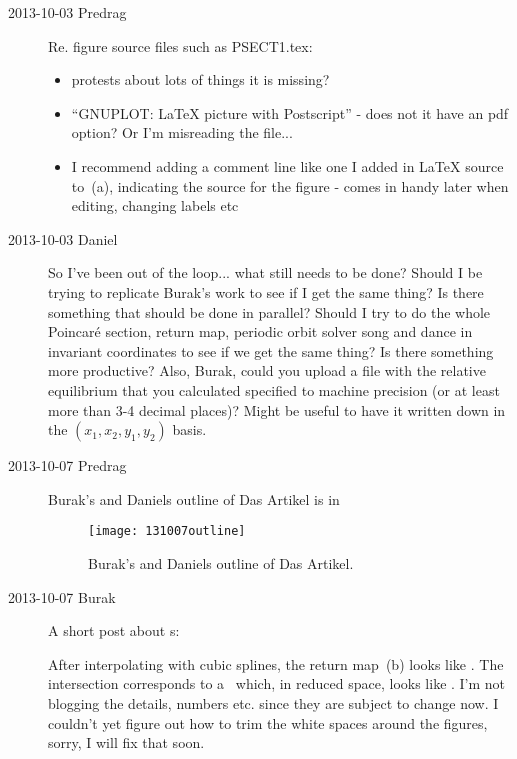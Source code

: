 \begin{description}
\item[2013-10-03 Predrag] Re. figure source files  such as PSECT1.tex:
\begin{itemize}
  \item protests about lots of things it is missing?
  \item ``GNUPLOT: LaTeX picture with Postscript'' - does not it have an pdf option?
  Or I'm misreading the file...
  \item I recommend adding a comment line like one I added in LaTeX source
    to \,(a), indicating the source for the figure -
    comes in handy later when editing, changing labels etc
\end{itemize}

\item[2013-10-03 Daniel] So I've been out of the loop... what still needs to be done?
Should I be trying to replicate Burak's work to see if I get the same thing? Is there
something that should be done in parallel? Should I try to do the whole Poincar\'e section,
return map, periodic orbit solver song and dance in invariant coordinates to see if we
get the same thing? Is there something more productive? Also, Burak, could you upload a file
with the relative equilibrium that you calculated specified to machine precision
(or at least more than 3-4 decimal places)? Might be useful to have it written down
in the $(x_1,x_2,y_1,y_2)$ basis.

\item[2013-10-07 Predrag] Burak's and Daniels outline of Das Artikel is
in 

\begin{figure}
  \centering
  \texttt{[image: 131007outline]}
  \caption{
Burak's and Daniels outline of Das Artikel.
  }\label{fig:131007outline}
\end{figure}


\item[2013-10-07 Burak] A short post about \rpo s:

After interpolating with cubic splines, the return map \,(b)
looks like . The intersection corresponds to a
\rpo\ which, in reduced space, looks like . I'm not blogging
the details, numbers etc. since they are subject to change now. I couldn't
yet figure out how to trim the white spaces around the figures, sorry, I will
fix that soon.



\end{description}
